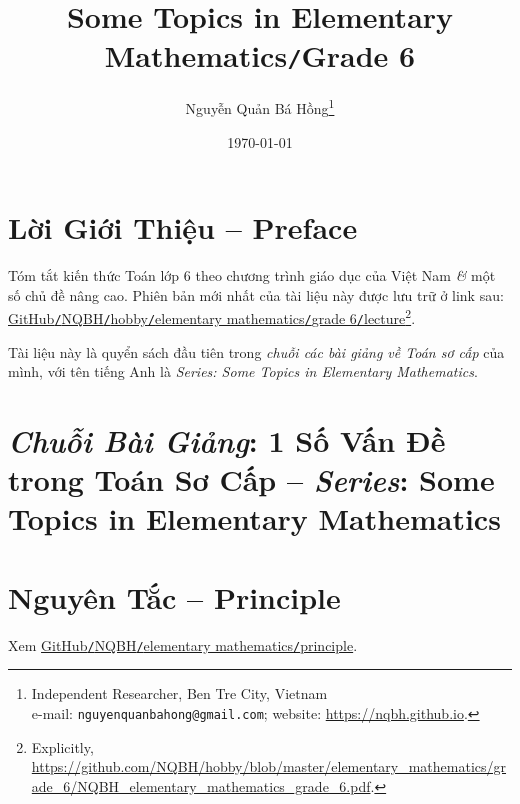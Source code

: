 \documentclass{article}
\title{Some Topics in Elementary Mathematics\texttt{/}Grade 6}
\author{Nguyễn Quản Bá Hồng\footnote{Independent Researcher, Ben Tre City, Vietnam\\e-mail: \texttt{nguyenquanbahong@gmail.com}; website: \url{https://nqbh.github.io}.}}
\date{\today}
\numberwithin{equation}{section}
\begin{document}
\maketitle
\begin{abstract}
	
\end{abstract}
\setcounter{secnumdepth}{4}
\setcounter{tocdepth}{3}
\tableofcontents
\newpage


\section*{Lời Giới Thiệu -- Preface}
Tóm tắt kiến thức Toán lớp 6 theo chương trình giáo dục của Việt Nam \textit{\&} một số chủ đề nâng cao. Phiên bản mới nhất của tài liệu này được lưu trữ ở link sau: \href{https://github.com/NQBH/hobby/blob/master/elementary_mathematics/grade_6/NQBH_elementary_mathematics_grade_6.pdf}{GitHub\texttt{/}NQBH\texttt{/}hobby\texttt{/}elementary mathematics\texttt{/}grade 6\texttt{/}lecture}\footnote{Explicitly, \url{https://github.com/NQBH/hobby/blob/master/elementary_mathematics/grade_6/NQBH_elementary_mathematics_grade_6.pdf}.}.

Tài liệu này là quyển sách đầu tiên trong \textit{chuỗi các bài giảng về Toán sơ cấp} của mình, với tên tiếng Anh là \textit{Series: Some Topics in Elementary Mathematics}.

\section*{\textit{Chuỗi Bài Giảng}: 1 Số Vấn Đề trong Toán Sơ Cấp -- \textit{Series}: Some Topics in Elementary Mathematics}


\section*{Nguyên Tắc -- Principle}
Xem \href{https://github.com/NQBH/hobby/blob/master/elementary_mathematics/principle/NQBH_elementary_mathematics_principle.pdf}{GitHub\texttt{/}NQBH\texttt{/}elementary mathematics\texttt{/}principle}.
\end{document}
